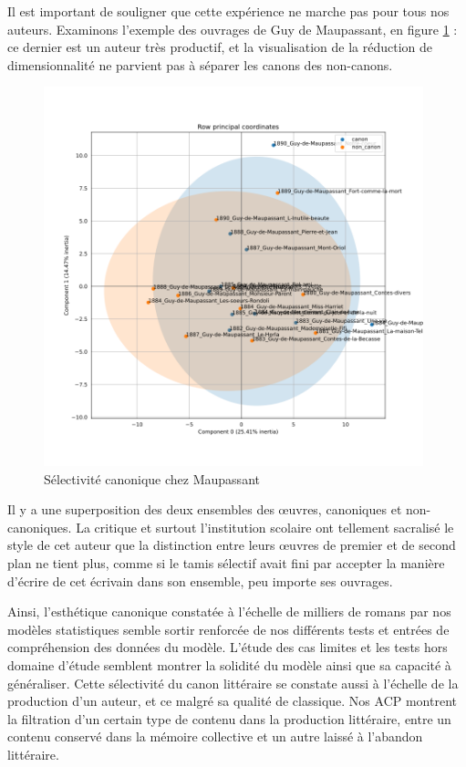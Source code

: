 Il est important de souligner que cette expérience ne marche pas pour tous nos auteurs. Examinons l'exemple des ouvrages de Guy de Maupassant, en figure \ref{maupa} : ce dernier est un auteur très productif, et la visualisation de la réduction de dimensionnalité ne parvient pas à séparer les canons des non-canons.

\bigskip
\begin{figure}[!ht]
    \centering
    \includegraphics[width=11cm]{img/17_pca_Maupassant.png}
    \caption{Sélectivité canonique chez Maupassant}
    \label{maupa}
\end{figure}

Il y a une superposition des deux ensembles des œuvres, canoniques et non-canoniques. La critique et surtout l'institution scolaire ont tellement sacralisé le style de cet auteur que la distinction entre leurs œuvres de premier et de second plan ne tient plus, comme si le tamis sélectif avait fini par accepter la manière d'écrire de cet écrivain dans son ensemble, peu importe ses ouvrages. 

Ainsi, l'esthétique canonique constatée à l'échelle de milliers de romans par nos modèles statistiques semble sortir renforcée de nos différents tests et entrées de compréhension des données du modèle. L'étude des cas limites et les tests hors domaine d'étude semblent montrer la solidité du modèle ainsi que sa capacité à généraliser. Cette sélectivité du canon littéraire se constate aussi à l'échelle de la production d'un auteur, et ce malgré sa qualité de classique. Nos ACP montrent la filtration d'un certain type de contenu dans la production littéraire, entre un contenu conservé dans la mémoire collective et un autre laissé à l'abandon littéraire. 
